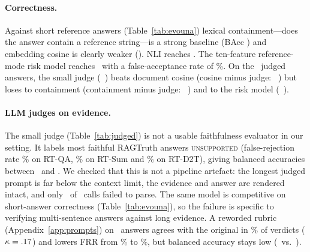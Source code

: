 \begin{table}[t]
\centering\small
\setlength{\tabcolsep}{3pt}
\resizebox{\columnwidth}{!}{}
\caption{Reference-based correctness on EVOUNA-NQ (\NTestEvouna\ test answers). The lower block compares the small judge with cheap methods on the judged subset.}
\label{tab:evouna}
\end{table}

\paragraph{Correctness.} Against short reference answers (Table~\ref{tab:evouna}) lexical containment---does the answer contain a reference string---is a strong baseline (BAcc \EvContainBacc) and embedding cosine is clearly weaker (\EvCosBacc). NLI reaches \EvNliBacc. The ten-feature reference-mode risk model reaches \EvRiskBacc\ with a false-acceptance rate of \EvRiskFar\%. On the \EvJudgeSmallN\ judged answers, the small judge (\EvJudgeSmallBacc\ \EvJudgeSmallBaccCi) beats document cosine (cosine minus judge: \EvCosMinusSmall\ \EvCosMinusSmallCi) but loses to containment (containment minus judge: \EvContainMinusSmall\ \EvContainMinusSmallCi) and to the risk model (\EvRiskMinusSmall\ \EvRiskMinusSmallCi).

\begin{table}[t]
\centering\small
\resizebox{\textwidth}{!}{}
\caption{LLM judges on the judged subsets (fixed, source-clustered samples of the test splits). Cheap methods are evaluated on exactly the same examples. FAR and FRR in \%. The last column is the full risk model minus the judge, with a 95\% cluster-bootstrap interval.}
\label{tab:judged}
\end{table}

\paragraph{LLM judges on evidence.} The small judge (Table~\ref{tab:judged}) is not a usable faithfulness evaluator in our setting. It labels most faithful RAGTruth answers \textsc{unsupported} (false-rejection rate \QaJudgeSmallFrr\% on RT-QA, \SumJudgeSmallFrr\% on RT-Sum and \DttJudgeSmallFrr\% on RT-D2T), giving balanced accuracies between \DttJudgeSmallBacc\ and \SumJudgeSmallBacc. We checked that this is not a pipeline artefact: the longest judged prompt is far below the context limit, the evidence and answer are rendered intact, and only \JudgeSmallFailures\ of \JudgeSmallCalls\ calls failed to parse. The same model is competitive on short-answer correctness (Table~\ref{tab:evouna}), so the failure is specific to verifying multi-sentence answers against long evidence. A reworded rubric (Appendix~\ref{app:prompts}) on \SensN\ answers agrees with the original in \SensAgree\% of verdicts ($\kappa=.17$) and lowers FRR from \SensFrrOne\% to \SensFrrTwo\%, but balanced accuracy stays low (\SensBaccOne\ vs.\ \SensBaccTwo).

